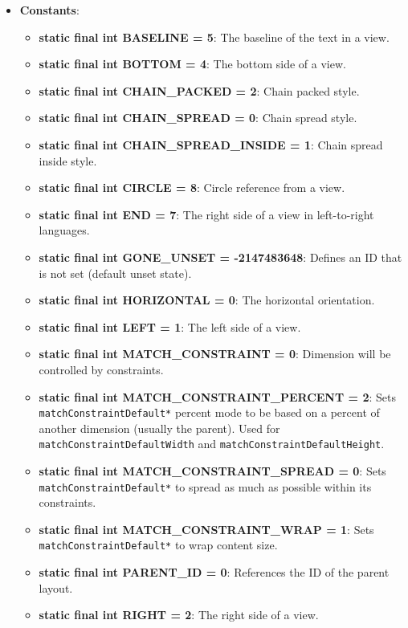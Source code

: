 \documentclass{report}
\begin{document}
\begin{itemize}
        \item \textbf{Constants}:
            \begin{itemize}
                \item \textbf{static final int BASELINE = 5}: The baseline of the text in a view.
                \item \textbf{static final int BOTTOM = 4}: The bottom side of a view.
                \item \textbf{static final int CHAIN\_PACKED = 2}: Chain packed style.
                \item \textbf{static final int CHAIN\_SPREAD = 0}: Chain spread style.
                \item \textbf{static final int CHAIN\_SPREAD\_INSIDE = 1}: Chain spread inside style.
                \item \textbf{static final int CIRCLE = 8}: Circle reference from a view.
                \item \textbf{static final int END = 7}: The right side of a view in left-to-right languages.
                \item \textbf{static final int GONE\_UNSET = -2147483648}: Defines an ID that is not set (default unset state).
                \item \textbf{static final int HORIZONTAL = 0}: The horizontal orientation.
                \item \textbf{static final int LEFT = 1}: The left side of a view.
                \item \textbf{static final int MATCH\_CONSTRAINT = 0}: Dimension will be controlled by constraints.
                \item \textbf{static final int MATCH\_CONSTRAINT\_PERCENT = 2}: Sets \texttt{matchConstraintDefault*} percent mode to be based on a percent of another dimension (usually the parent). Used for \texttt{matchConstraintDefaultWidth} and \texttt{matchConstraintDefaultHeight}.
                \item \textbf{static final int MATCH\_CONSTRAINT\_SPREAD = 0}: Sets \texttt{matchConstraintDefault*} to spread as much as possible within its constraints.
                \item \textbf{static final int MATCH\_CONSTRAINT\_WRAP = 1}: Sets \texttt{matchConstraintDefault*} to wrap content size.
                \item \textbf{static final int PARENT\_ID = 0}: References the ID of the parent layout.
                \item \textbf{static final int RIGHT = 2}: The right side of a view.

\end{itemize}
\end{itemize}
\end{document}
